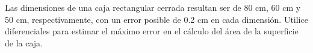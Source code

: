 \item Las dimensiones de una caja rectangular cerrada resultan ser de 80 cm, 60 cm y 50 cm, respectivamente, con un error posible de 0.2 cm en cada dimensión. Utilice diferenciales para estimar el máximo error en el cálculo del área de la superficie de la caja.

